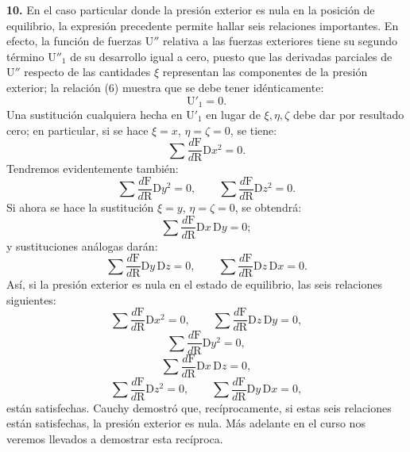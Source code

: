 \noindent\textbf{10.} En el caso particular donde la presión exterior es
nula en la posición de equilibrio, la expresión precedente permite hallar
seis relaciones importantes. En efecto, la función de fuerzas
$\mathrm{U}''$ relativa a las fuerzas exteriores tiene su segundo término
$\mathrm{U}''_1$ de su desarrollo igual a cero, puesto que las derivadas
parciales de $\mathrm{U}''$ respecto de las cantidades $\xi$ representan
las componentes de la presión exterior; la relación (6) muestra que se debe
tener idénticamente:
\[
\mathrm{U}'_1=0.
\]
Una sustitución cualquiera hecha en $\mathrm{U}'_1$ en lugar de $\xi,\eta,\zeta$
debe dar por resultado cero; en particular, si se hace $\xi=x$,
$\eta=\zeta=0$, se tiene:
\[
\sum\frac{d\mathrm{F}}{d\mathrm{R}}\mathrm{D}x^2=0.
\]
Tendremos evidentemente también:
\[
\sum\frac{d\mathrm{F}}{d\mathrm{R}}\mathrm{D}y^2=0,\qquad
\sum\frac{d\mathrm{F}}{d\mathrm{R}}\mathrm{D}z^2=0.
\]
Si ahora se hace la sustitución $\xi=y$, $\eta=\zeta=0$,
se obtendrá:
\[
\sum\frac{d\mathrm{F}}{d\mathrm{R}}\mathrm{D}x\,\mathrm{D}y=0;
\]
y sustituciones análogas darán:
\[
\sum\frac{d\mathrm{F}}{d\mathrm{R}}\mathrm{D}y\,\mathrm{D}z=0,\qquad
\sum\frac{d\mathrm{F}}{d\mathrm{R}}\mathrm{D}z\,\mathrm{D}x=0.
\]
Así, si la presión exterior es nula en el estado de equilibrio, las seis
relaciones siguientes:
\[
\sum\frac{d\mathrm{F}}{d\mathrm{R}}\mathrm{D}x^2=0,\qquad
\sum\frac{d\mathrm{F}}{d\mathrm{R}}\mathrm{D}z\,\mathrm{D}y=0,
\]
\begin{equation}
\sum\frac{d\mathrm{F}}{d\mathrm{R}}\mathrm{D}y^2=0,
\tag{13}
\end{equation}
\begin{equation}
\sum\frac{d\mathrm{F}}{d\mathrm{R}}\mathrm{D}x\,\mathrm{D}z=0,
\tag{14}
\end{equation}
\[
\sum\frac{d\mathrm{F}}{d\mathrm{R}}\mathrm{D}z^2=0,\qquad
\sum\frac{d\mathrm{F}}{d\mathrm{R}}\mathrm{D}y\,\mathrm{D}x=0,
\]
están satisfechas. Cauchy demostró que, recíprocamente, si estas seis
relaciones están satisfechas, la presión exterior es nula. Más adelante en
el curso nos veremos llevados a demostrar esta recíproca.

